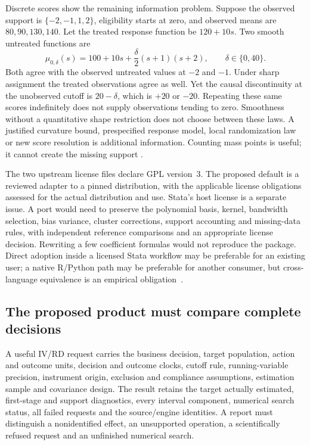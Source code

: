 Discrete scores show the remaining information problem. Suppose the
observed support is $\{-2,-1,1,2\}$, eligibility starts at zero, and
observed means are $80,90,130,140$. Let the treated response function
be $120+10s$. Two smooth untreated functions are
\[
 \mu_{0,\delta}(s)=100+10s+
             \frac{\delta}{2}(s+1)(s+2),\qquad \delta\in\{0,40\}.
\]
Both agree with the observed untreated values at $-2$ and $-1$.
Under sharp assignment the treated observations agree as well. Yet
the causal discontinuity at the unobserved cutoff is $20-\delta$,
which is $+20$ or $-20$. Repeating these same scores indefinitely
does not supply observations tending to zero. Smoothness without a
quantitative shape restriction does not choose between these laws.
A justified curvature bound, prespecified response model, local
randomization law or new score resolution is additional information.
Counting mass points is useful; it cannot create the missing support
\citep{exec13_ivrd_exact}.

The two upstream license files declare GPL version~3. The proposed
default is a reviewed adapter to a pinned distribution, with the
applicable license obligations assessed for the actual distribution
and use. Stata's host license is a separate issue. A port would need
to preserve the polynomial basis, kernel, bandwidth selection, bias
variance, cluster corrections, support accounting and missing-data
rules, with independent reference comparisons and an appropriate
license decision. Rewriting a few coefficient formulas would not
reproduce the package. Direct adoption inside a licensed Stata
workflow may be preferable for an existing user; a native R/Python
path may be preferable for another consumer, but cross-language
equivalence is an empirical obligation~\citep{exec13_ivrd_rdrobust,exec13_ivrd_rddensity}.

\subsection{The proposed product must compare complete decisions}

A useful IV/RD request carries the business decision, target population,
action and outcome units, decision and outcome clocks, cutoff rule,
running-variable precision, instrument origin, exclusion and compliance
assumptions, estimation sample and covariance design. The result retains
the target actually estimated, first-stage and support diagnostics,
every interval component, numerical search status, all failed requests
and the source/engine identities. A report must distinguish a
nonidentified effect, an unsupported operation, a scientifically
refused request and an unfinished numerical search.

